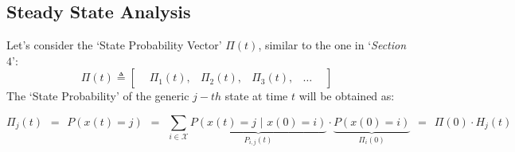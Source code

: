 \documentclass[12pt,a4paper]{article}
\begin{document}
\subsection{Steady State Analysis}
Let's consider the `State Probability Vector' $\Pi(t)$, similar to the one in `\emph{Section $4$}':
$$
\Pi(t)\triangleq \left[
\begin{matrix}
&\Pi_1(t),& \Pi_2(t),& \Pi_3(t),& \dots&
\end{matrix}
\right]
$$ 
The `State Probability' of the generic $j-th$ state at time $t$ will be obtained as:

$$
\Pi_j\left(t\right)\hspace{5pt}=\hspace{5pt} P\left(x\left(t\right)=j\right)
\hspace{5pt}=\hspace{5pt} 
\sum_{i\in\mathcal{X}}{
\underbrace{
P\left( x \left( t \right) = j \hspace{4pt}|\hspace{4pt}  x\left(0\right)=i\right)
}_{P_{i,j}(t)}
\cdot
\underbrace{
P\left(x\left(0\right)=i\right)
}_{\Pi_i(0)}
}\hspace{5pt}=\hspace{5pt}
\Pi(0)\cdot H_j(t)
$$
\end{document}
